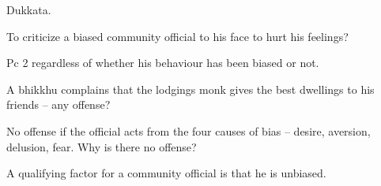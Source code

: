 \begin{solution}
  Dukkata.
\end{solution}

\bigskip

To criticize a biased community official to his face to hurt his feelings?

\begin{solution}
  Pc 2 regardless of whether his behaviour has been biased or not.
\end{solution}

\bigskip

A bhikkhu complains that the lodgings monk gives the best dwellings to his friends – any offense?

\begin{solution}
  No offense if the official acts from the four causes of bias – desire, aversion,
  delusion, fear. Why is there no offense?

  A qualifying factor for a community official is that he is unbiased.
\end{solution}
